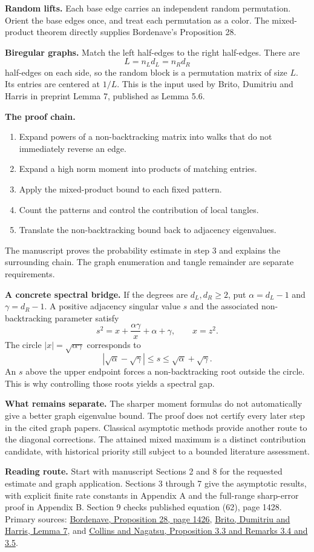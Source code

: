 \documentclass[11pt]{article}
\newcommand{\pagetitle}[2]{\noindent{\small\sffamily\color{teal}#1}\par\vspace{5pt}\noindent{\LARGE\bfseries\color{ink}#2}\par\vspace{12pt}}
\begin{document}
\newpage
\pagetitle{BACK TO GRAPHS}{What this proves for the spectral argument}

\textbf{Random lifts.} Each base edge carries an independent random permutation. Orient the base edges once, and treat each permutation as a color. The mixed-product theorem directly supplies Bordenave's Proposition 28.

\textbf{Biregular graphs.} Match the left half-edges to the right half-edges. There are
\[
L=n_Ld_L=n_Rd_R
\]
half-edges on each side, so the random block is a permutation matrix of size $L$. Its entries are centered at $1/L$. This is the input used by Brito, Dumitriu and Harris in preprint Lemma 7, published as Lemma 5.6.

\textbf{The proof chain.}
\begin{enumerate}
\item Expand powers of a non-backtracking matrix into walks that do not immediately reverse an edge.
\item Expand a high norm moment into products of matching entries.
\item Apply the mixed-product bound to each fixed pattern.
\item Count the patterns and control the contribution of local tangles.
\item Translate the non-backtracking bound back to adjacency eigenvalues.
\end{enumerate}
The manuscript proves the probability estimate in step 3 and explains the surrounding chain. The graph enumeration and tangle remainder are separate requirements.

\textbf{A concrete spectral bridge.} If the degrees are $d_L,d_R\ge2$, put $\alpha=d_L-1$ and $\gamma=d_R-1$. A positive adjacency singular value $s$ and the associated non-backtracking parameter satisfy
\[
s^2=x+\frac{\alpha\gamma}{x}+\alpha+\gamma,\qquad x=z^2.
\]
The circle $|x|=\sqrt{\alpha\gamma}$ corresponds to
\[
|\sqrt\alpha-\sqrt\gamma|\le s\le\sqrt\alpha+\sqrt\gamma.
\]
An $s$ above the upper endpoint forces a non-backtracking root outside the circle. This is why controlling those roots yields a spectral gap.

\textbf{What remains separate.} The sharper moment formulas do not automatically give a better graph eigenvalue bound. The proof does not certify every later step in the cited graph papers. Classical asymptotic methods provide another route to the diagonal corrections. The attained mixed maximum is a distinct contribution candidate, with historical priority still subject to a bounded literature assessment.

\vfill
{\small\color{ink}\textbf{Reading route.} Start with manuscript Sections 2 and 8 for the requested estimate and graph application. Sections 3 through 7 give the asymptotic results, with explicit finite rate constants in Appendix A and the full-range sharp-error proof in Appendix B. Section 9 checks published equation (62), page 1428. Primary sources: \href{https://smf.emath.fr/download/pdf/1498332}{Bordenave, Proposition 28, page 1426}, \href{https://arxiv.org/abs/1804.07808v6}{Brito, Dumitriu and Harris, Lemma 7}, and \href{https://doi.org/10.5802/alco.480}{Collins and Nagatsu, Proposition 3.3 and Remarks 3.4 and 3.5}.}
\end{document}
